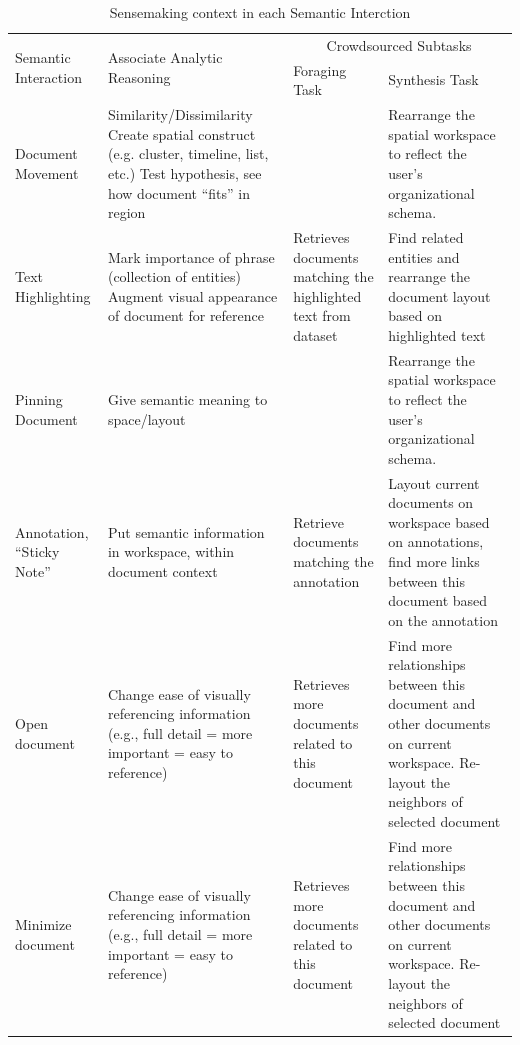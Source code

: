 \documentclass[journal]{vgtc}                %
\begin{document}
\begin{table}[t]
  \caption{Sensemaking context in each Semantic Interction}
  \label{tab:context}
  \centering
  \begin{tabular}{| m{2cm} | m{6cm} | m{4cm} | m{4cm} |}
  \hline
   \multirow{2}{2cm}{Semantic Interaction} & \multirow{2}{6cm}{Associate Analytic Reasoning} & \multicolumn{2}{c|}{Crowdsourced Subtasks} \\ \cline{3-4} & & Foraging Task & Synthesis Task\\ \hline

Document Movement  &  Similarity/Dissimilarity \newline Create spatial construct (e.g. cluster, timeline, list, etc.) \newline Test hypothesis, see how document “fits” in region &  & Rearrange the spatial workspace to reflect the user’s organizational schema.\\ \hline

Text Highlighting & Mark importance of phrase (collection of entities) \newline Augment visual appearance of document for reference  & Retrieves documents matching the highlighted text from dataset & Find related entities and rearrange the document layout based on highlighted text \\ \hline

Pinning Document & Give semantic meaning to space/layout &  & Rearrange the spatial workspace to reflect the user’s organizational schema.\\ \hline

Annotation, “Sticky Note” & Put semantic information in workspace, within document context & Retrieve documents matching the annotation & Layout current documents on workspace based on annotations, find more links between this document based on the annotation\\ \hline

Open document & Change ease of visually referencing information (e.g., full detail = more important = easy to reference) & Retrieves more documents related to this document & Find more relationships between this document and other documents on current workspace. Re-layout the neighbors of selected document \\ \hline

Minimize document & Change ease of visually referencing information (e.g., full detail = more important = easy to reference) & Retrieves more documents related to this document & Find more relationships between this document and other documents on current workspace. Re-layout the neighbors of selected document \\ \hline


\end{tabular}
\end{table}
\end{document}
